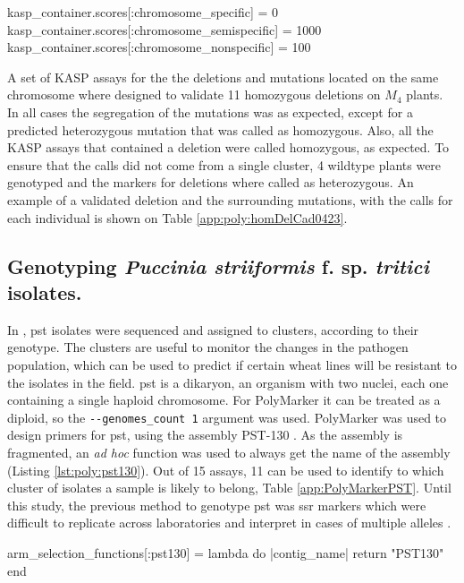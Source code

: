 \begin{code}[language=Ruby,caption=Score values to select semi-specifc primers, label=lst:poly:delsScore]
kasp_container.scores[:chromosome_specific] = 0
kasp_container.scores[:chromosome_semispecific] = 1000
kasp_container.scores[:chromosome_nonspecific] = 100    
\end{code}

A set of KASP assays for the the deletions and mutations located on the same chromosome where designed to validate 11 homozygous deletions on $M_{4}$ plants. 
In all cases the segregation of the mutations was as expected, except for a predicted heterozygous mutation that was called as homozygous. 
Also, all the KASP assays that contained a deletion were called homozygous, as expected. 
To ensure that the calls did not come from a single cluster, 4 wildtype plants were genotyped and the markers for deletions where called as heterozygous. 
An example of a validated deletion and the surrounding mutations, with the calls for each individual is shown on Table \ref{app:poly:homDelCad0423}. 
  



\subsection{Genotyping \textit{Puccinia 
striiformis} f. sp. \textit{tritici} isolates.}
In \cite{Hubbard2015}, \gls{pst} isolates were sequenced and assigned to clusters, according to their genotype.
The clusters are useful to monitor the changes in the pathogen population, which can be used to predict if certain wheat lines will be resistant to the isolates in the field. 
\gls{pst} is a dikaryon, an organism with two nuclei, each one containing a single haploid chromosome.
For PolyMarker it can be treated as a diploid, so the \verb|--genomes_count 1| argument was used.
PolyMarker was used to design primers for \gls{pst}, using the assembly PST-130 \citet{Cantu2011}.
As the assembly is fragmented, an \textit{ad hoc} function was used to always get the name of the assembly (Listing \ref{lst:poly:pst130}). 
Out of 15 assays, 11 can be used to identify to which cluster of isolates a sample is likely to belong, Table \ref{app:PolyMarkerPST}.
Until this study, the previous method to genotype \gls{pst} was \gls{ssr} markers which were difficult to replicate across laboratories and interpret in cases of multiple alleles \citep{Ali2014}.

\begin{code}[language=Ruby,caption=Function that always returns PST130 as chromosome, label=lst:poly:pst130]
arm_selection_functions[:pst130] = lambda do |contig_name|       
  return "PST130"
end
\end{code}

